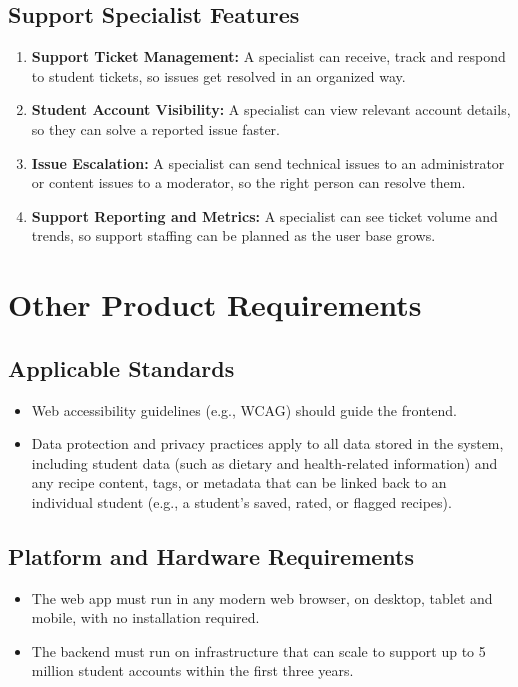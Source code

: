 \documentclass[10pt,letterpaper]{article}
\begin{document}
\subsection{Support Specialist Features}
\begin{enumerate}[leftmargin=1.7em, start=29]
  \item \textbf{Support Ticket Management:} A specialist can receive, track and respond to student tickets, so issues get resolved in an organized way.
  \item \textbf{Student Account Visibility:} A specialist can view relevant account details, so they can solve a reported issue faster.
  \item \textbf{Issue Escalation:} A specialist can send technical issues to an administrator or content issues to a moderator, so the right person can resolve them.
  \item \textbf{Support Reporting and Metrics:} A specialist can see ticket volume and trends, so support staffing can be planned as the user base grows.
\end{enumerate}

\section{Other Product Requirements}

\subsection{Applicable Standards}
\begin{itemize}[leftmargin=1.5em]
  \item Web accessibility guidelines (e.g., WCAG) should guide the frontend.
  \item Data protection and privacy practices apply to all data stored in the system, including student data (such as dietary and health-related information) and any recipe content, tags, or metadata that can be linked back to an individual student (e.g., a student's saved, rated, or flagged recipes).
\end{itemize}

\subsection{Platform and Hardware Requirements}
\begin{itemize}[leftmargin=1.5em]
  \item The web app must run in any modern web browser, on desktop, tablet and mobile, with no installation required.
  \item The backend must run on infrastructure that can scale to support up to 5 million student accounts within the first three years.
\end{itemize}
\end{document}
